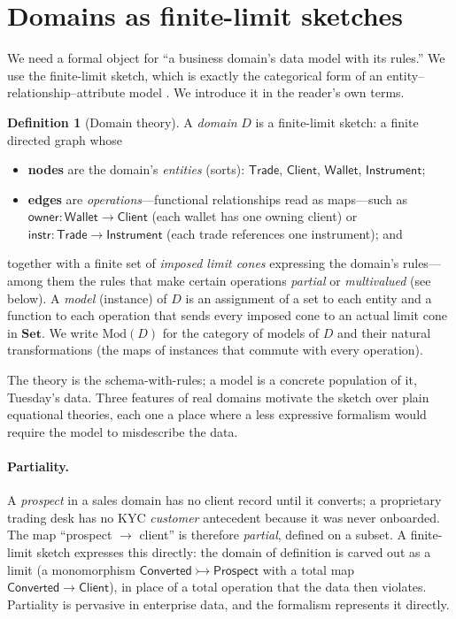 \documentclass[11pt]{article}
\theoremstyle{plain}
\theoremstyle{definition}
\newtheorem{definition}{Definition}
\newcommand{\Set}{\mathbf{Set}}
\newcommand{\Mod}{\mathrm{Mod}}
\newcommand{\Trade}{\mathsf{Trade}}
\newcommand{\Inst}{\mathsf{Instrument}}
\newcommand{\Client}{\mathsf{Client}}
\newcommand{\Wallet}{\mathsf{Wallet}}
\begin{document}
\section{Domains as finite-limit sketches}\label{sec:domains}

We need a formal object for ``a business domain's data model with its rules.'' We use the finite-limit sketch, which is exactly the categorical form of an entity--relationship--attribute model \cite{johnson-rosebrugh}. We introduce it in the reader's own terms.

\begin{definition}[Domain theory]\label{def:domain}
A \emph{domain} $D$ is a finite-limit sketch: a finite directed graph whose
\begin{itemize}[leftmargin=1.4em,itemsep=0.1em]
  \item \textbf{nodes} are the domain's \emph{entities} (sorts): $\Trade$, $\Client$, $\Wallet$, $\Inst$;
  \item \textbf{edges} are \emph{operations}---functional relationships read as maps---such as $\mathsf{owner}\colon \Wallet \to \Client$ (each wallet has one owning client) or $\mathsf{instr}\colon \Trade \to \Inst$ (each trade references one instrument); and
\end{itemize}
together with a finite set of \emph{imposed limit cones} expressing the domain's rules---among them the rules that make certain operations \emph{partial} or \emph{multivalued} (see below). A \emph{model} (instance) of $D$ is an assignment of a set to each entity and a function to each operation that sends every imposed cone to an actual limit cone in $\Set$. We write $\Mod(D)$ for the category of models of $D$ and their natural transformations (the maps of instances that commute with every operation).
\end{definition}

The theory is the schema-with-rules; a model is a concrete population of it, Tuesday's data. Three features of real domains motivate the sketch over plain equational theories, each one a place where a less expressive formalism would require the model to misdescribe the data.

\paragraph{Partiality.} A \emph{prospect} in a sales domain has no client record until it converts; a proprietary trading desk has no KYC \emph{customer} antecedent because it was never onboarded. The map ``prospect $\to$ client'' is therefore \emph{partial}, defined on a subset. A finite-limit sketch expresses this directly: the domain of definition is carved out as a limit (a monomorphism $\mathsf{Converted} \rightarrowtail \mathsf{Prospect}$ with a total map $\mathsf{Converted} \to \Client$), in place of a total operation that the data then violates. Partiality is pervasive in enterprise data, and the formalism represents it directly.
\end{document}
